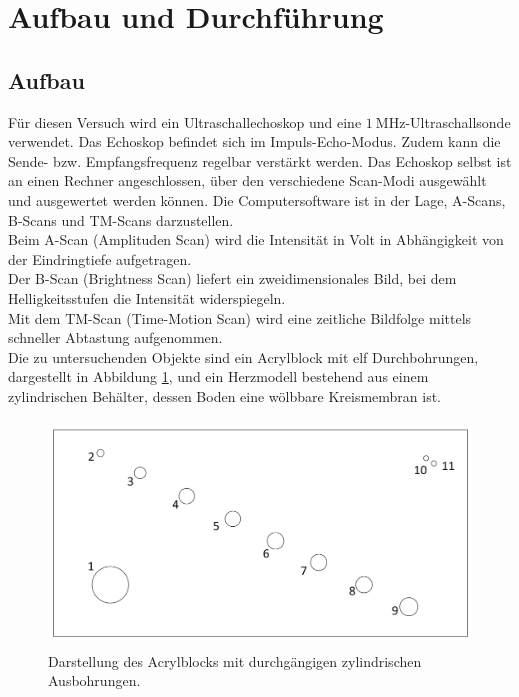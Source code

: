 \section{Aufbau und Durchführung}
\subsection{Aufbau}
\label{sec:Aufbau}

Für diesen Versuch wird ein Ultraschallechoskop und eine $\SI{1}{\mega\hertz}$-Ultraschallsonde verwendet.
Das Echoskop befindet sich im Impuls-Echo-Modus.
Zudem kann die Sende- bzw. Empfangsfrequenz regelbar verstärkt werden.
Das Echoskop selbst ist an einen Rechner angeschlossen, über den verschiedene Scan-Modi ausgewählt und ausgewertet werden können.
Die Computersoftware ist in der Lage, A-Scans, B-Scans und TM-Scans darzustellen.\\
Beim A-Scan (Amplituden Scan) wird die Intensität in Volt in Abhängigkeit von der Eindringtiefe aufgetragen.\\
Der B-Scan (Brightness Scan) liefert ein zweidimensionales Bild, bei dem Helligkeitsstufen die Intensität widerspiegeln.\\
Mit dem TM-Scan (Time-Motion Scan) wird eine zeitliche Bildfolge mittels schneller Abtastung aufgenommen.\\
Die zu untersuchenden Objekte sind ein Acrylblock mit elf Durchbohrungen, dargestellt in Abbildung \ref{abb:1}, und ein Herzmodell bestehend aus einem zylindrischen Behälter, dessen Boden eine wölbbare Kreismembran ist.
\begin{figure}[H]
  \centering
  \includegraphics[height=6cm]{ressources/aufbau.png}
  \caption{Darstellung des Acrylblocks mit durchgängigen zylindrischen Ausbohrungen. \cite{skript}}
  \label{abb:1}
\end{figure}

